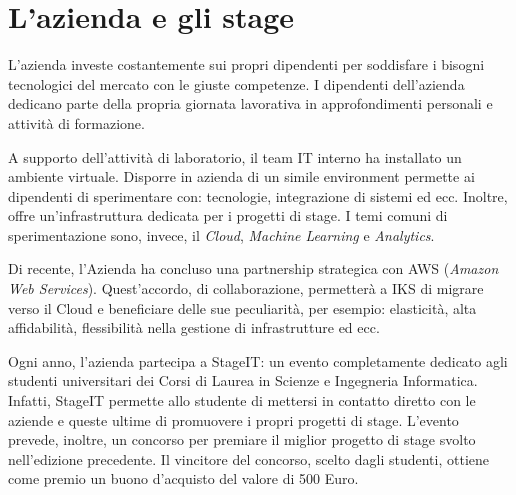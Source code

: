 
\chapter{L'azienda e gli stage}
\label{cap:stage}


\vspace{20pt}
L'azienda investe costantemente sui propri dipendenti per soddisfare i bisogni tecnologici del mercato con le giuste competenze. 
I dipendenti dell'azienda dedicano parte della propria giornata lavorativa in approfondimenti personali e attività di formazione. 

A supporto dell'attività di laboratorio, il team IT interno ha installato un ambiente virtuale. Disporre in azienda di un simile environment permette ai dipendenti di sperimentare con: tecnologie, integrazione di sistemi ed ecc. Inoltre, offre un'infrastruttura dedicata per i progetti di stage. I temi comuni di sperimentazione sono, invece, il  \textit{Cloud}, \textit{Machine Learning} e \textit{Analytics}. 

Di recente, l'Azienda ha concluso una partnership strategica con AWS (\textit{Amazon Web Services}). Quest'accordo, di collaborazione, permetterà a IKS di migrare verso il Cloud e beneficiare delle sue peculiarità, per esempio: elasticità, alta affidabilità, flessibilità nella gestione di infrastrutture ed ecc. 

Ogni anno, l'azienda partecipa a StageIT: un evento completamente dedicato agli studenti universitari dei Corsi di Laurea in Scienze e Ingegneria Informatica.
Infatti, StageIT permette  allo studente di mettersi in contatto diretto con le aziende e queste ultime di promuovere i propri progetti di stage. 
L'evento prevede, inoltre, un concorso per premiare il miglior progetto di stage svolto nell'edizione precedente. Il vincitore del concorso, scelto dagli studenti, ottiene come premio un buono d'acquisto del valore di 500 Euro.

